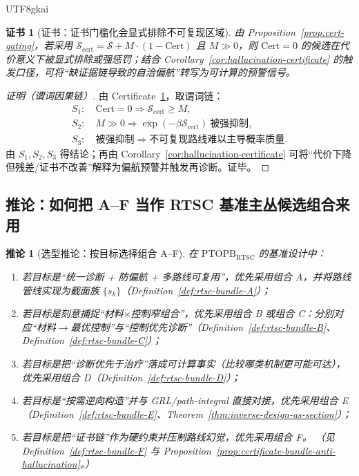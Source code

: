 \documentclass[12pt]{article}
\newtheorem{corollary}{推论}[section]
\newtheorem{certificate}{证书}[section]
\newcommand{\PTOPB}{\ensuremath{\mathrm{PTOPB}}}
\newcommand{\RTSC}{\textsf{RTSC}}
\begin{document}
\begin{CJK*}{UTF8}{gkai}
\begin{certificate}[证书：证书门槛化会显式排除不可复现区域]
\label{cert:certificate-bundle-anti-hallucination}
由 Proposition~\ref{prop:cert-gating}，若采用 $\mathcal{S}_{\mathrm{cert}}=\mathcal{S}+M\cdot(1-\mathrm{Cert})$ 且 $M\gg 0$，则
  $\mathrm{Cert}=0$ 的候选在代价意义下被显式排除或强惩罚；结合 Corollary~\ref{cor:hallucination-certificate} 的触发口径，可将“缺证据链导致的自洽偏航”转写为可计算的预警信号。

\end{certificate}

\begin{proof}[证明（谓词因果链）]
由 Certificate~\ref{cert:certificate-bundle-anti-hallucination}，取谓词链：
\[
\begin{aligned}
S_1:&\ \mathrm{Cert}=0\Rightarrow \mathcal{S}_{\mathrm{cert}}\ge M,\\
S_2:&\ M\gg 0\Rightarrow \exp(-\beta \mathcal{S}_{\mathrm{cert}})\ \text{被强抑制},\\
S_3:&\ \text{被强抑制}\Rightarrow \text{不可复现路线难以主导概率质量}.
\end{aligned}
\]
由 $S_1,S_2,S_3$ 得结论；再由 Corollary~\ref{cor:hallucination-certificate} 可将“代价下降但残差/证书不改善”解释为偏航预警并触发再诊断。证毕。
\end{proof}

\subsection{推论：如何把 A--F 当作 \RTSC{} 基准主丛候选组合来用}

\begin{corollary}[选型推论：按目标选择组合 A--F]
\label{cor:rtsc-bundle-selection}
在 \PTOPB$_{\mathrm{RTSC}}$ 的基准设计中：
\begin{enumerate}
  \item 若目标是“统一诊断 + 防偏航 + 多路线可复用”，优先采用组合 A，并将路线管线实现为截面族 $\{s_k\}$（Definition~\ref{def:rtsc-bundle-A}）；
  \item 若目标是刻意捕捉“材料$\times$控制窄组合”，优先采用组合 B 或组合 C：分别对应“材料$\to$最优控制”与“控制优先诊断”（Definition~\ref{def:rtsc-bundle-B}、
    Definition~\ref{def:rtsc-bundle-C}）；
  \item 若目标是把“诊断优先于治疗”落成可计算事实（比较哪类机制更可能可达），优先采用组合 D（Definition~\ref{def:rtsc-bundle-D}）；
  \item 若目标是“按需逆向构造”并与 GRL/path-integral 直接对接，优先采用组合 E（Definition~\ref{def:rtsc-bundle-E}、Theorem~\ref{thm:inverse-design-as-section}）；
  \item 若目标是把“证书链”作为硬约束并压制路线幻觉，优先采用组合 F。
  （见 Definition~\ref{def:rtsc-bundle-F} 与 Proposition~\ref{prop:certificate-bundle-anti-hallucination}。）
\end{enumerate}
\end{corollary}


\end{CJK*}
\end{document}
